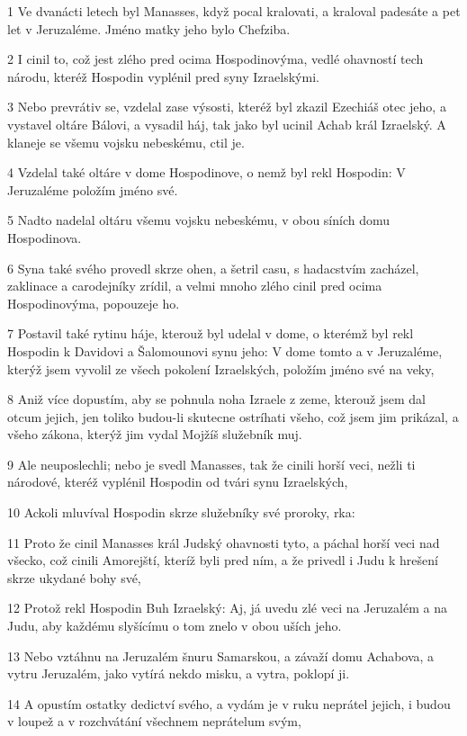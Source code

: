 \par 1 Ve dvanácti letech byl Manasses, když pocal kralovati, a kraloval padesáte a pet let v Jeruzaléme. Jméno matky jeho bylo Chefziba.
\par 2 I cinil to, což jest zlého pred ocima Hospodinovýma, vedlé ohavností tech národu, kteréž Hospodin vyplénil pred syny Izraelskými.
\par 3 Nebo prevrátiv se, vzdelal zase výsosti, kteréž byl zkazil Ezechiáš otec jeho, a vystavel oltáre Bálovi, a vysadil háj, tak jako byl ucinil Achab král Izraelský. A klaneje se všemu vojsku nebeskému, ctil je.
\par 4 Vzdelal také oltáre v dome Hospodinove, o nemž byl rekl Hospodin: V Jeruzaléme položím jméno své.
\par 5 Nadto nadelal oltáru všemu vojsku nebeskému, v obou síních domu Hospodinova.
\par 6 Syna také svého provedl skrze ohen, a šetril casu, s hadacstvím zacházel, zaklinace a carodejníky zrídil, a velmi mnoho zlého cinil pred ocima Hospodinovýma, popouzeje ho.
\par 7 Postavil také rytinu háje, kterouž byl udelal v dome, o kterémž byl rekl Hospodin k Davidovi a Šalomounovi synu jeho: V dome tomto a v Jeruzaléme, kterýž jsem vyvolil ze všech pokolení Izraelských, položím jméno své na veky,
\par 8 Aniž více dopustím, aby se pohnula noha Izraele z zeme, kterouž jsem dal otcum jejich, jen toliko budou-li skutecne ostríhati všeho, což jsem jim prikázal, a všeho zákona, kterýž jim vydal Mojžíš služebník muj.
\par 9 Ale neuposlechli; nebo je svedl Manasses, tak že cinili horší veci, nežli ti národové, kteréž vyplénil Hospodin od tvári synu Izraelských,
\par 10 Ackoli mluvíval Hospodin skrze služebníky své proroky, rka:
\par 11 Proto že cinil Manasses král Judský ohavnosti tyto, a páchal horší veci nad všecko, což cinili Amorejští, kteríž byli pred ním, a že privedl i Judu k hrešení skrze ukydané bohy své,
\par 12 Protož rekl Hospodin Buh Izraelský: Aj, já uvedu zlé veci na Jeruzalém a na Judu, aby každému slyšícímu o tom znelo v obou uších jeho.
\par 13 Nebo vztáhnu na Jeruzalém šnuru Samarskou, a závaží domu Achabova, a vytru Jeruzalém, jako vytírá nekdo misku, a vytra, poklopí ji.
\par 14 A opustím ostatky dedictví svého, a vydám je v ruku neprátel jejich, i budou v loupež a v rozchvátání všechnem neprátelum svým,
